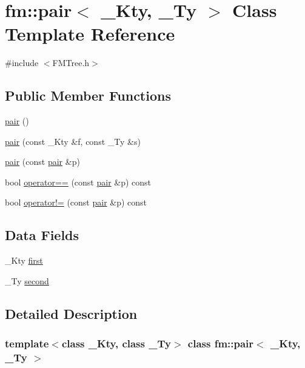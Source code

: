 \hypertarget{classfm_1_1pair}{
\section{fm::pair$<$ \_\-Kty, \_\-Ty $>$ Class Template Reference}
\label{classfm_1_1pair}
}


{\ttfamily \#include $<$FMTree.h$>$}

\subsection*{Public Member Functions}
\begin{DoxyCompactItemize}
\item 
\hyperlink{classfm_1_1pair_a523cfcc6a881d0e7bd2523ff29cdae5c}{pair} ()
\item 
\hyperlink{classfm_1_1pair_a93060222846a0ded493455668885d186}{pair} (const \_\-Kty \&f, const \_\-Ty \&s)
\item 
\hyperlink{classfm_1_1pair_ab8ee957c64f6475c9e60d06f1d3e885f}{pair} (const \hyperlink{classfm_1_1pair}{pair} \&p)
\item 
bool \hyperlink{classfm_1_1pair_af531c9d7ff82ca65b5e69cafaaaae6cd}{operator==} (const \hyperlink{classfm_1_1pair}{pair} \&p) const 
\item 
bool \hyperlink{classfm_1_1pair_af965c8761cb9303f4830c538dfdab3a0}{operator!=} (const \hyperlink{classfm_1_1pair}{pair} \&p) const 
\end{DoxyCompactItemize}
\subsection*{Data Fields}
\begin{DoxyCompactItemize}
\item 
\_\-Kty \hyperlink{classfm_1_1pair_afc22e37d084f7a4e731a297b72b3efd7}{first}
\item 
\_\-Ty \hyperlink{classfm_1_1pair_a80c0b96ba80f34765fd06b0899506977}{second}
\end{DoxyCompactItemize}


\subsection{Detailed Description}
\subsubsection*{template$<$class \_\-Kty, class \_\-Ty$>$ class fm::pair$<$ \_\-Kty, \_\-Ty $>$}

